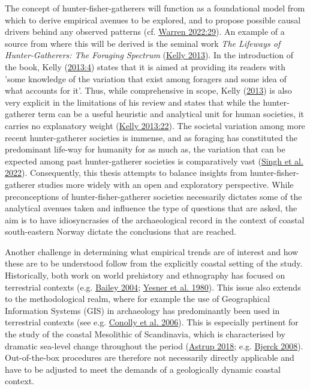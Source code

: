 \documentclass[
  a4paper,
  oneside]{uiophdthesis}
\begin{document}
The concept of hunter-fisher-gatherers will function as a foundational model from which to derive empirical avenues to be explored, and to propose possible causal drivers behind any observed patterns (cf. \protect\hyperlink{ref-warren2022}{Warren 2022:29}). An example of a source from where this will be derived is the seminal work \emph{The Lifeways of Hunter-Gatherers: The Foraging Spectrum} (\protect\hyperlink{ref-kelly2013}{Kelly 2013}). In the introduction of the book, Kelly (\protect\hyperlink{ref-kelly2013}{2013:4}) states that it is aimed at providing its readers with 'some knowledge of the variation that exist among foragers and some idea of what accounts for it'. Thus, while comprehensive in scope, Kelly (\protect\hyperlink{ref-kelly2013}{2013}) is also very explicit in the limitations of his review and states that while the hunter-gatherer term can be a useful heuristic and analytical unit for human societies, it carries no explanatory weight (\protect\hyperlink{ref-kelly2013}{Kelly 2013:22}). The societal variation among more recent hunter-gatherer societies is immense, and as foraging has constituted the predominant life-way for humanity for as much as, the variation that can be expected among past hunter-gatherer societies is comparatively vast (\protect\hyperlink{ref-singh2022}{Singh et al. 2022}). Consequently, this thesis attempts to balance insights from hunter-fisher-gatherer studies more widely with an open and exploratory perspective. While preconceptions of hunter-fisher-gatherer societies necessarily dictates some of the analytical avenues taken and influence the type of questions that are asked, the aim is to have idiosyncrasies of the archaeological record in the context of coastal south-eastern Norway dictate the conclusions that are reached.

Another challenge in determining what empirical trends are of interest and how these are to be understood follow from the explicitly coastal setting of the study. Historically, both work on world prehistory and ethnography has focused on terrestrial contexts (e.g. \protect\hyperlink{ref-bailey2004}{Bailey 2004}; \protect\hyperlink{ref-yesner1980}{Yesner et al. 1980}). This issue also extends to the methodological realm, where for example the use of Geographical Information Systems (GIS) in archaeology has predominantly been used in terrestrial contexts (see e.g. \protect\hyperlink{ref-conolly2006}{Conolly et al. 2006}). This is especially pertinent for the study of the coastal Mesolithic of Scandinavia, which is characterised by dramatic sea-level change throughout the period (\protect\hyperlink{ref-astrup2018}{Astrup 2018}; e.g. \protect\hyperlink{ref-bjerck2008}{Bjerck 2008}). Out-of-the-box procedures are therefore not necessarily directly applicable and have to be adjusted to meet the demands of a geologically dynamic coastal context.
\end{document}
